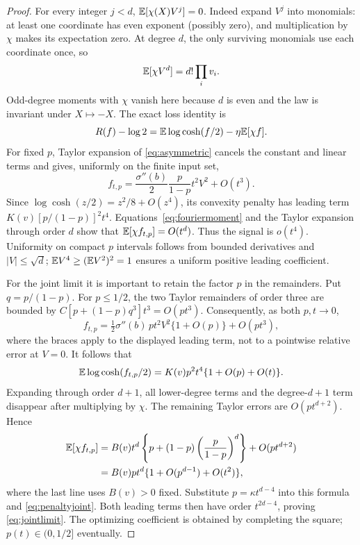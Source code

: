 \begin{proof}
For every integer $j<d$, $\mathbb E[\chi(X)V^j]=0$. Indeed expand $V^j$
into monomials: at least one coordinate has even exponent (possibly zero),
and multiplication by $\chi$ makes its expectation zero. At degree $d$,
the only surviving monomials use each coordinate once, so
\begin{equation}\label{eq:fouriermoment}
 \mathbb E[\chi V^d]=d!\prod_i v_i.
\end{equation}
Odd-degree moments with $\chi$ vanish here because $d$ is even and the law
is invariant under $X\mapsto-X$.
The exact loss identity is
\begin{equation}\label{eq:parityrisk}
 R(f)-\log2=\mathbb E\log\cosh(f/2)-\eta\mathbb E[\chi f].
\end{equation}
For fixed $p$, Taylor expansion of \eqref{eq:asymmetric} cancels the constant
and linear terms and gives, uniformly on the finite input set,
\[
 f_{t,p}=\frac{\sigma''(b)}2\frac{p}{1-p}t^2 V^2+O(t^3).
\]
Since $\log\cosh(z/2)=z^2/8+O(z^4)$, its convexity penalty has leading
term $K(v)[p/(1-p)]^2t^4$. Equations~\eqref{eq:fouriermoment}
and the Taylor expansion through order $d$ show that $\mathbb E[\chi f_{t,p}]=O(t^d)$.
Thus the signal is $o(t^4)$. Uniformity on compact $p$ intervals follows
from bounded derivatives and $|V|\le\sqrt d$; $\mathbb E V^4\ge(\mathbb E V^2)^2=1$
ensures a uniform positive leading coefficient.

For the joint limit it is important to retain the factor $p$ in the
remainders. Put $q=p/(1-p)$. For $p\le1/2$, the two Taylor remainders of
order three are bounded by $C[p+(1-p)q^3]t^3=O(pt^3)$.
Consequently, as both $p,t\to0$,
\[
 f_{t,p}=\tfrac12\sigma''(b)\,p t^2 V^2\{1+O(p)\}+O(pt^3),
\]
where the braces apply to the displayed leading term, not to a pointwise
relative error at $V=0$. It follows that
\begin{equation}\label{eq:penaltyjoint}
 \mathbb E\log\cosh(f_{t,p}/2)=K(v)p^2t^4\{1+O(p)+O(t)\}.
\end{equation}
Expanding through order $d+1$, all lower-degree terms and the degree-$d+1$
term disappear after multiplying by $\chi$. The remaining Taylor errors
are $O(pt^{d+2})$. Hence
\begin{align*}
 \mathbb E[\chi f_{t,p}]
 &=B(v)t^d\left\{p+(1-p)\left(\frac p{1-p}\right)^d\right\}
    +O(pt^{d+2})\\
 &=B(v)pt^d\{1+O(p^{d-1})+O(t^2)\},
\end{align*}
where the last line uses $B(v)>0$ fixed. Substitute
$p=\kappa t^{d-4}$ into this formula and \eqref{eq:penaltyjoint}.
Both leading terms then have order $t^{2d-4}$, proving
\eqref{eq:jointlimit}. The optimizing coefficient is obtained by completing
the square; $p(t)\in(0,1/2]$ eventually.


\end{proof}

